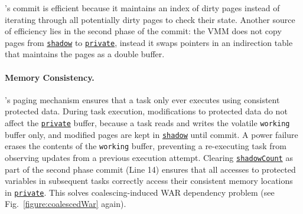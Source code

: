 \sys's commit is efficient because it maintains an index of dirty pages instead of iterating through all potentially dirty pages to check their state.
Another source of efficiency lies in the second phase of the commit:
the VMM does not copy pages from \texttt{\underline{shadow}} to \texttt{\underline{private}}, instead it swaps pointers in an indirection table that maintains the pages as a double buffer.

\paragraph{Memory Consistency.}
\sys's paging mechanism ensures that a task only ever executes using consistent protected data. During task execution, modifications to protected data do not affect the \texttt{\underline{private}} buffer, because a task reads and writes the volatile \texttt{working} buffer only, and modified pages are kept in \texttt{\underline{shadow}} until commit. A power failure erases the contents of the \texttt{working} buffer, preventing a re-executing task from observing updates from a previous execution attempt. Clearing \texttt{\underline{shadowCount}} as part of the second phase commit (Line 14) ensures that all accesses to protected variables in subsequent tasks correctly access their consistent memory locations in \texttt{\underline{private}}. This solves coalescing-induced WAR dependency problem (see Fig.~\ref{figure:coalescedWar} again).

